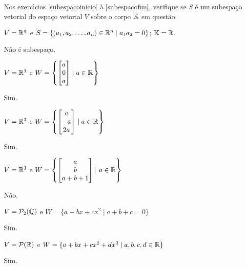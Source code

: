 \documentclass[12pt]{exam}
\begin{document}
Nos exerc{\'\i}cios \ref{subespacoinicio} \`a \ref{subespacofim}, verifique se $S$ \'e um subespa\c{c}o vetorial do espa\c{c}o vetorial $V$ sobre o corpo $\mathbb{K}$ em quest\~ao:
\begin{exercicio}\label{subespacoinicio}
	$V = \mathbb{R}^n$ e $S = \{(a_1, a_2, \dots, a_n) \in \mathbb{R}^n \mid a_1a_2 = 0\}$; $\mathbb{K} = \mathbb{R}$.
	\begin{solucao}
		N\~ao \'e subespa\c{c}o.
	\end{solucao}
\end{exercicio}

\begin{exercicio}
    $V = \mathbb{R}^3$ e $W = \left\{\begin{bmatrix}a\\0\\a\end{bmatrix} \mid a \in \mathbb{R}\right\}$
    \begin{solucao}
    	Sim.
    \end{solucao}
\end{exercicio}

\begin{exercicio}
    $V = \mathbb{R}^3$ e $W = \left\{\begin{bmatrix}a\\-a\\2a\end{bmatrix} \mid a \in \mathbb{R}\right\}$
		\begin{solucao}
    	Sim.
    \end{solucao}
\end{exercicio}

\begin{exercicio}
    $V = \mathbb{R}^3$ e $W = \left\{\begin{bmatrix}a\\b\\a + b + 1\end{bmatrix} \mid a \in \mathbb{R}\right\}$
    \begin{solucao}
    	Não.
    \end{solucao}
\end{exercicio}

\begin{exercicio}
    $V = \mathcal{P}_2(\mathbb{Q})$ e $W = \{a + bx + cx^2 \mid a + b + c = 0\}$
    \begin{solucao}
    	Sim.
    \end{solucao}
\end{exercicio}

\begin{exercicio}
    $V = \mathcal{P}(\mathbb{R})$ e $W = \{a + bx + cx^2 + dx^3\mid a, b, c, d \in \mathbb{R}\}$
    \begin{solucao}
    	Sim.
    \end{solucao}
\end{exercicio}
\end{document}
